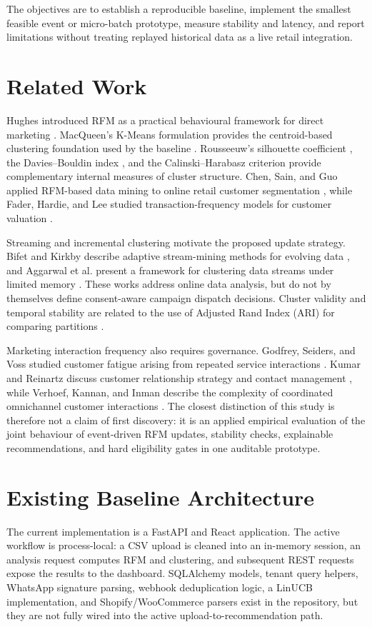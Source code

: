 \documentclass[conference]{IEEEtran}
\begin{document}
The objectives are to establish a reproducible baseline, implement the smallest feasible event or micro-batch prototype, measure stability and latency, and report limitations without treating replayed historical data as a live retail integration.

\section{Related Work}
Hughes introduced RFM as a practical behavioural framework for direct marketing \cite{hughes1994}. MacQueen's K-Means formulation provides the centroid-based clustering foundation used by the baseline \cite{macqueen1967}. Rousseeuw's silhouette coefficient \cite{rousseeuw1987}, the Davies--Bouldin index \cite{davies1979}, and the Calinski--Harabasz criterion \cite{calinski1974} provide complementary internal measures of cluster structure. Chen, Sain, and Guo applied RFM-based data mining to online retail customer segmentation \cite{chen2012}, while Fader, Hardie, and Lee studied transaction-frequency models for customer valuation \cite{fader2005}.

Streaming and incremental clustering motivate the proposed update strategy. Bifet and Kirkby describe adaptive stream-mining methods for evolving data \cite{bifet2009}, and Aggarwal et al. present a framework for clustering data streams under limited memory \cite{aggarwal2003}. These works address online data analysis, but do not by themselves define consent-aware campaign dispatch decisions. Cluster validity and temporal stability are related to the use of Adjusted Rand Index (ARI) for comparing partitions \cite{hubert1985}.

Marketing interaction frequency also requires governance. Godfrey, Seiders, and Voss studied customer fatigue arising from repeated service interactions \cite{godfrey2011}. Kumar and Reinartz discuss customer relationship strategy and contact management \cite{kumar2016}, while Verhoef, Kannan, and Inman describe the complexity of coordinated omnichannel customer interactions \cite{verhoef2015}. The closest distinction of this study is therefore not a claim of first discovery: it is an applied empirical evaluation of the joint behaviour of event-driven RFM updates, stability checks, explainable recommendations, and hard eligibility gates in one auditable prototype.

\section{Existing Baseline Architecture}
The current implementation is a FastAPI and React application. The active workflow is process-local: a CSV upload is cleaned into an in-memory session, an analysis request computes RFM and clustering, and subsequent REST requests expose the results to the dashboard. SQLAlchemy models, tenant query helpers, WhatsApp signature parsing, webhook deduplication logic, a LinUCB implementation, and Shopify/WooCommerce parsers exist in the repository, but they are not fully wired into the active upload-to-recommendation path.
\end{document}
